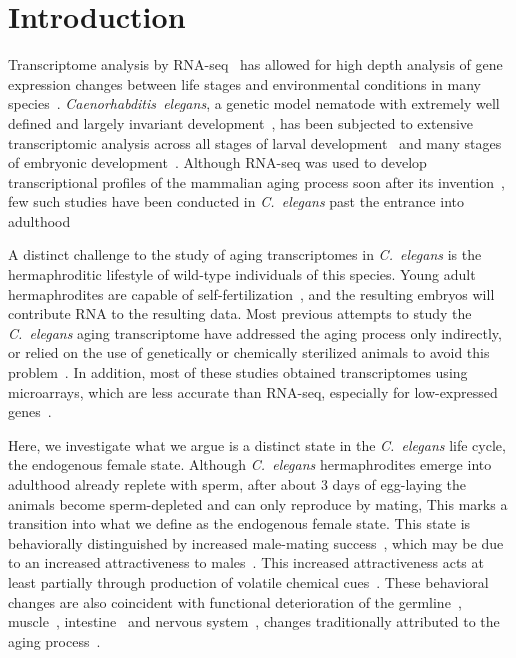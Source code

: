 \documentclass[10pt,letterpaper,twocolumn]{article}
\newcommand{\cel}{\emph{C.~elegans}}
\begin{document}
\section*{Introduction}
\label{sec:introduction}
Transcriptome analysis by RNA-seq~\cite{Mortazavi2008} has allowed for high depth analysis of gene expression changes between life stages and environmental conditions in many species~\cite{Gerstein2014,Blaxter2012}. \emph{Caenorhabditis~elegans}, a genetic model nematode with extremely well defined and largely invariant development~\cite{}, has been subjected to extensive transcriptomic analysis across all stages of larval development~\cite{Hillier2009,Boeck2016,Murray2012}
and many stages of embryonic development~\cite{Boeck2016}. Although RNA-seq was used to develop transcriptional profiles of the mammalian aging process soon after its invention~\cite{Magalhaes2010}, few such studies have been conducted in \cel{} past the entrance into adulthood

A distinct challenge to the study of aging transcriptomes in \cel{} is the hermaphroditic lifestyle of wild-type individuals of this species. Young adult hermaphrodites are capable of self-fertilization~\cite{}, and the resulting embryos will contribute RNA to the resulting data.
Most previous attempts to study the \cel{} aging transcriptome have addressed the aging process only indirectly, or relied on the use of genetically or chemically sterilized animals to avoid this problem~\cite{Murphy2003,Halaschek-wiener2005,Lund2002,McCormick2012,Eckley2013,Boeck2016,Rangaraju2015}.
In addition, most of these studies obtained transcriptomes using microarrays, which are less accurate than RNA-seq, especially for low-expressed genes~\cite{Wang2014}.

Here, we investigate what we argue is a distinct state in the \cel{} life cycle, the endogenous female state. Although \cel{} hermaphrodites emerge into adulthood already replete with sperm, after about 3 days of egg-laying the animals become sperm-depleted and can only reproduce by mating, This marks a transition into what we define as the endogenous female state. This state is behaviorally distinguished by increased male-mating success~\cite{Garcia2007}, which may be due to an increased attractiveness to males~\cite{Morsci2011}. This increased attractiveness acts at least partially through production of volatile chemical cues~\cite{Leighton2014}.
These behavioral changes are also coincident with functional deterioration of the germline~\cite{Andux2008}, muscle~\cite{Herndon2002}, intestine~\cite{McGee2011} and nervous system~\cite{Liu2013}, changes traditionally attributed to the aging process~\cite{}.
\end{document}
